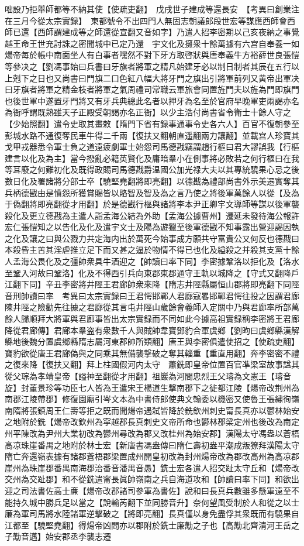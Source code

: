 咄設乃拒舉師都等不納其使【使疏吏翻】　戊戌世子建成等還長安　【考異曰創業注在三月今從太宗實録】　東都號令不出四門人無固志朝議郎段世宏等謀應西師會西師已還【西師謂建成等之師還從宣翻又音如字】乃遣人招李密期以己亥夜納之事覺越王命王世充討誅之密聞城中已定乃還　宇文化及擁衆十餘萬據有六宫自奉養一如煬帝每於帳中南面坐人有白事者嘿然不對下牙方取啓狀與唐奉義牛方裕薛世良張愷等參决之【劉馮事始曰兵書曰牙旗者將軍之精凡始建牙必以制日制者其辰在五行以上剋下之日也又尚書曰門旗二口色紅八幅大將牙門之旗出引將軍前列又黄帝出軍决曰牙旗者將軍之精金枝者將軍之氣周禮司常職云軍旅會同置旌門夫以旌為門即旗門也後世軍中遂置牙門將又有牙兵典總此名者以押牙為名至於官府早晚軍吏兩謁亦名為衙呼謂既熟雖天子正殿受朝謁亦名正衙】以少主浩付尚書省令衛士十餘人守之【少始照翻】遣令史取其畫敕【隋門下省有録事通事令史各六人】百官不復朝參至彭城水路不通復奪民車牛得二千兩【復扶又翻朝直遥翻兩力讓翻】並載宫人珍寶其戈甲戎器悉令軍士負之道遠疲劇軍士始怨司馬德戡竊謂趙行樞曰君大謬誤我【行樞建言以化及為主】當今撥亂必籍英賢化及庸暗羣小在側事將必敗若之何行樞曰在我等耳廢之何難初化及既得政賜司馬德戡爵温國公加光禄大夫以其專統驍果心忌之後數日化及署諸將分部士卒【驍堅堯翻將即亮翻】以德戡為禮部尚書外示美遷實奪其兵柄德戡由是憤怨所獲賞賜皆以賂智及智及為之言乃使之將後軍萬餘人以從【及為于偽翻將即亮翻從才用翻】於是德戡行樞與諸將李本尹正卿宇文導師等謀以後軍襲殺化及更立德戡為主遣人詣孟海公結為外助【孟海公據曹州】遷延未發待海公報許宏仁張愷知之以告化及化及遣宇文士及陽為遊獵至後軍德戡不知事露出營迎謁因執之化及讓之曰與公戮力共定海内出於萬死今始事成方願共守富貴公又何反也德戡曰本殺昏主苦其淫虐推立足下而又甚之逼於物情不得已也化及縊殺之并殺其支黨十餘人孟海公畏化及之彊帥衆具牛酒迎之【帥讀曰率下同】李密據鞏洛以拒化及【洛水至鞏入河故曰鞏洛】化及不得西引兵向東郡東郡通守王軌以城降之【守式又翻降戶江翻下同】辛丑李密將井陘王君廊帥衆來降【隋志井陘縣屬恒山郡將即亮翻下同陘音刑帥讀曰率　考異曰太宗實録曰王君愕邯鄲人君廊寇畧邯鄲君愕往投之因謂君廊陳井陘之險勸先往據之君廊從其言屯井陘山歲餘會義師入定關中乃與君廊率所部萬餘人歸順拜大將軍與君廊事皆出太宗實録而不同如此今據高祖實録稱李密將王君廊降從君廊傳】君廊本羣盗有衆數千人與賊帥韋寶鄧豹合軍虞鄉【劉昫曰虞鄉縣漢解縣地後魏分置虞鄉縣隋志屬河東郡帥所類翻】唐王與李密俱遣使招之【使疏吏翻】寶豹欲從唐王君廊偽與之同乘其無備襲撃破之奪其輜重【重直用翻】奔李密密不禮之復來降【復扶又翻】拜上柱國假河内太守　蕭銑即皇帝位置百官凖梁室故事諡其從父琮為孝靖皇帝【謚神至翻從才用翻】祖巖為河間忠烈王父璿為文憲王【璿音旋】封董景珍等功臣七人皆為王遣宋王楊道生撃南郡下之徙都江陵【煬帝改荆州為南郡江陵帶郡】修復園廟引岑文本為中書侍郎使典文翰委以機密又使魯王張繡徇嶺南隋將張鎮周王仁壽等拒之既而聞煬帝遇弑皆降於銑欽州刺史甯長真亦以鬱林始安之地附於銑【煬帝改欽州為寜越郡長真刺史文帝所命也鬰林郡梁定州也後改為南定州平陳改為尹州大業初改為鬰州尋改為郡又改桂州為始安郡】漢陽太守馮盎以蒼梧高凉珠崖番禺之地附於林士宏【新唐書馮盎傳曰隋仁壽初盎平潮成叛獠拜漢陽太守隋亡奔還嶺表據有諸郡蒼梧郡梁置成州開皇初改為封州煬帝改為郡改高州為高凉郡崖州為珠崖郡番禺南海郡治番音潘禺音愚】銑士宏各遣人招交趾太守丘和【煬帝改交州為交趾郡】和不從銑遣甯長眞帥嶺南之兵自海道攻和【帥讀曰率下同】和欲出迎之司法書佐高士亷【煬帝改郡諸司參軍為書佐】說和曰長真兵數雖多懸軍遠至不能持久城中勝兵足以當之【說輸芮翻下並同勝音升】奈何望風受制於人和從之以士廉為軍司馬將水陸諸軍逆擊破之【將即亮翻】長真僅以身免盡俘其衆既而有驍果自江都至【驍堅堯翻】得煬帝凶問亦以郡附於銑士廉勱之子也【高勱北齊清河王岳之子勱音邁】始安郡丞李襲志遷